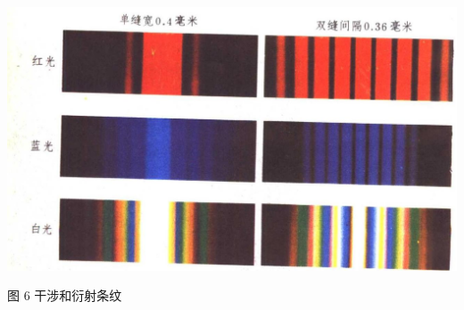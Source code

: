 \documentclass[10pt]{article}
\begin{document}
\begin{center}
\includegraphics[max width=1.0\textwidth]{images/01913056-1f15-74d8-9184-9aab52c9d66b_4_537717.jpg}
\end{center}

图 6 干涉和衍射条纹
\end{document}
